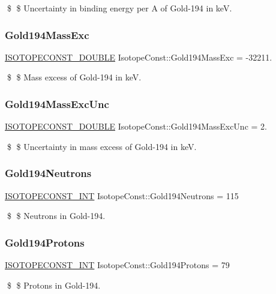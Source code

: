 \$ \$ Uncertainty in binding energy per A of Gold-\/194 in keV. \mbox{\label{group___isotope_const-_gold-_au194_gaf884a649cfb7a0029da13cc13d5645a3}} 
\subsubsection{\texorpdfstring{Gold194\+Mass\+Exc}{Gold194MassExc}}
{\footnotesize\ttfamily \mbox{\hyperlink{group___isotope_const-_macros_ga8f45a7272ce02c0b4c65c44636ed719a}{I\+S\+O\+T\+O\+P\+E\+C\+O\+N\+S\+T\+\_\+\+D\+O\+U\+B\+LE}} Isotope\+Const\+::\+Gold194\+Mass\+Exc = -\/32211.}

\$ \$ Mass excess of Gold-\/194 in keV. \mbox{\label{group___isotope_const-_gold-_au194_gac75d07e1a12dc42cfe7520f218c37558}} 
\subsubsection{\texorpdfstring{Gold194\+Mass\+Exc\+Unc}{Gold194MassExcUnc}}
{\footnotesize\ttfamily \mbox{\hyperlink{group___isotope_const-_macros_ga8f45a7272ce02c0b4c65c44636ed719a}{I\+S\+O\+T\+O\+P\+E\+C\+O\+N\+S\+T\+\_\+\+D\+O\+U\+B\+LE}} Isotope\+Const\+::\+Gold194\+Mass\+Exc\+Unc = 2.}

\$ \$ Uncertainty in mass excess of Gold-\/194 in keV. \mbox{\label{group___isotope_const-_gold-_au194_ga6ff869cac154be0fec5835ea4fade7bf}} 
\subsubsection{\texorpdfstring{Gold194\+Neutrons}{Gold194Neutrons}}
{\footnotesize\ttfamily \mbox{\hyperlink{group___isotope_const-_macros_ga5f18360b3e99483a35c32d789e62621c}{I\+S\+O\+T\+O\+P\+E\+C\+O\+N\+S\+T\+\_\+\+I\+NT}} Isotope\+Const\+::\+Gold194\+Neutrons = 115}

\$ \$ Neutrons in Gold-\/194. \mbox{\label{group___isotope_const-_gold-_au194_ga12fa91472d53bd9053c4722a9d47c833}} 
\subsubsection{\texorpdfstring{Gold194\+Protons}{Gold194Protons}}
{\footnotesize\ttfamily \mbox{\hyperlink{group___isotope_const-_macros_ga5f18360b3e99483a35c32d789e62621c}{I\+S\+O\+T\+O\+P\+E\+C\+O\+N\+S\+T\+\_\+\+I\+NT}} Isotope\+Const\+::\+Gold194\+Protons = 79}

\$ \$ Protons in Gold-\/194. 